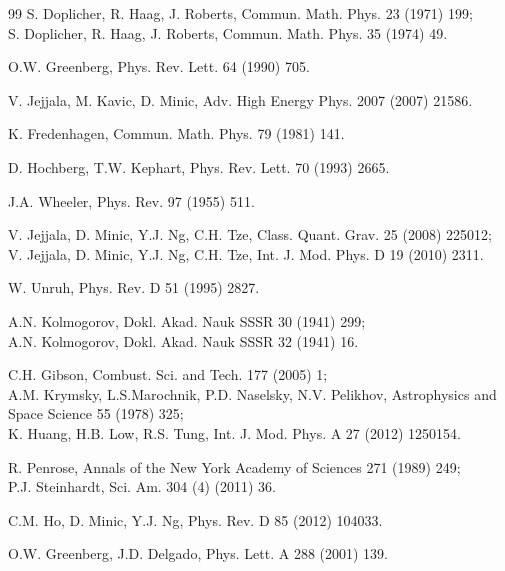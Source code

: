 \documentclass[12pt]{article}
\begin{document}
\begin{thebibliography}{99}
S. Doplicher, R. Haag, J. Roberts, 
Commun. Math. Phys. 23 (1971) 199;\\
S. Doplicher, R. Haag, J. Roberts, 
Commun. Math. Phys. 35 (1974) 49.

O.W. Greenberg, 
Phys. Rev. Lett. 64 (1990) 705.

V. Jejjala, M. Kavic, D. Minic, 
Adv. High Energy Phys. 2007 (2007) 21586.


K. Fredenhagen, 
Commun. Math. Phys. 79 (1981) 141.

D. Hochberg, T.W. Kephart, Phys. Rev. Lett. 70 (1993) 2665.


J.A. Wheeler, 
Phys. Rev. 97 (1955) 511.

V. Jejjala, D. Minic, Y.J. Ng, C.H. Tze, 
Class. Quant. Grav. 25 (2008) 225012;\\
V. Jejjala, D. Minic, Y.J. Ng, C.H. Tze,
Int. J. Mod. Phys. D 19 (2010) 2311.


W. Unruh, 
Phys. Rev. D 51 (1995) 2827.

A.N. Kolmogorov,  
Dokl. Akad. Nauk SSSR 30 (1941) 299;\\
A.N. Kolmogorov,
Dokl. Akad. Nauk SSSR 32 (1941) 16.


C.H. Gibson, Combust. Sci. and Tech. 177 (2005) 1;\\
A.M. Krymsky, L.S.Marochnik, P.D. Naselsky, N.V. Pelikhov,
Astrophysics and Space Science 55 (1978) 325;\\
K. Huang, H.B. Low, R.S. Tung,
Int. J. Mod. Phys. A 27 (2012) 1250154.

R. Penrose, Annals of the New York Academy of Sciences 271 (1989) 249;\\
P.J. Steinhardt, Sci. Am. 304 (4) (2011) 36.


C.M. Ho, D. Minic, Y.J. Ng, Phys. Rev. D 85 (2012) 104033.


O.W. Greenberg, J.D. Delgado, Phys. Lett. A 288 (2001) 139.


\end{thebibliography}
\end{document}

